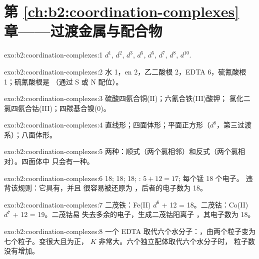 \section*{第 \ref{ch:b2:coordination-complexes} 章——过渡金属与配合物}

\begin{solution}{exo:b2:coordination-complexes:1}
 $d^1$,  $d^2$,  $d^3$,  $d^5$,  $d^5$, 
$d^7$,  $d^8$,  $d^{10}$.
\end{solution}

\begin{solution}{exo:b2:coordination-complexes:2}
水 1，en 2，乙二酸根 2，EDTA 6，硫氰酸根 1；硫氰酸根是
（通过 S 或 N 配位）。
\end{solution}

\begin{solution}{exo:b2:coordination-complexes:3}
硫酸四氨合铜(II)；六氰合铁(III)酸钾；
氯化二氯四氨合钴(III)；四羰基合镍(0)。
\end{solution}

\begin{solution}{exo:b2:coordination-complexes:4}
直线形；四面体形；平面正方形（$d^8$，第三过渡系）；八面体形。
\end{solution}

\begin{solution}{exo:b2:coordination-complexes:5}
两种：顺式（两个氯相邻）和反式（两个氯相对）。四面体中
只会有一种。
\end{solution}

\begin{solution}{exo:b2:coordination-complexes:6}
 18;  18;  18; : $5 + 12 = 17$;
 每个锰 18 个电子。 违背该规则：它具有，并且
很容易被还原为 \ce{[V(CO)6]-}，后者的电子数为 18。
\end{solution}

\begin{solution}{exo:b2:coordination-complexes:7}
二茂铁：Fe(II) $d^6$ + 12 = 18。二茂钴：Co(II) $d^7$ + 12 = 19。二茂钴易
失去多余的电子，生成二茂钴阳离子 \ce{[Co(C5H5)2]+}，其电子数为 18。
\end{solution}

\begin{solution}{exo:b2:coordination-complexes:8}
一个 EDTA 取代六个水分子：，由两个粒子变为七个粒子。变很大且为正，
$K$ 非常大。六个独立配体取代六个水分子时，
粒子数没有增加。
\end{solution}

